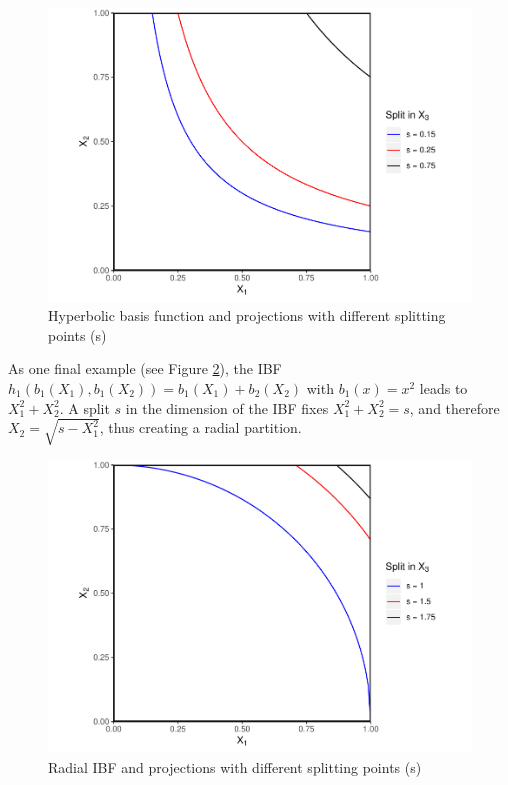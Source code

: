 \documentclass[]{elsarticle} %
\makeatletter
\def\maxwidth{\ifdim\Gin@nat@width>\linewidth\linewidth
\else\Gin@nat@width\fi}
\let\Oldincludegraphics\includegraphics
\renewcommand{\includegraphics}[1]{\Oldincludegraphics[width=\maxwidth]{#1}}
\makeatother
\begin{document}
\begin{figure}[htbp]
\centering
\includegraphics{Trees_with_Base_Functions_v2_files/figure-latex/fig5-hyperbolic-basis-1.pdf}
\caption{\label{fig:fig5-hyperbolic-basis}Hyperbolic basis function and
projections with different splitting points (s)}
\end{figure}

As one final example (see Figure \ref{fig:fig6-radial-basis}), the IBF
\(h_1(b_1(X_1),b_1(X_2))=b_1(X_1)+b_2(X_2)\) with \(b_1(x)=x^2\) leads
to \(X_1^2 + X_2^2\). A split \(s\) in the dimension of the IBF fixes
\(X_1^2 + X_2^2=s\), and therefore \(X_2=\sqrt{s-X_1^2}\), thus creating
a radial partition.

\begin{figure}[htbp]
\centering
\includegraphics{Trees_with_Base_Functions_v2_files/figure-latex/fig6-radial-basis-1.pdf}
\caption{\label{fig:fig6-radial-basis}Radial IBF and projections with
different splitting points (s)}
\end{figure}
\end{document}
